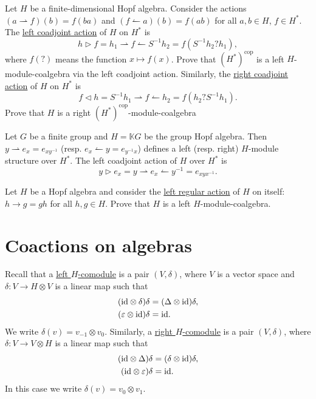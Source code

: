 \begin{exercise}
Let $H$ be a finite-dimensional Hopf algebra. Consider the actions
$(a\rightharpoonup f)(b)=f(ba)$ and $(f\leftharpoonup a)(b)=f(ab)$
for all $a,b\in H$, $f\in H^{*}$. The \underline{left coadjoint action}
of $H$ on $H^{*}$ is 
\[
h\triangleright f=h_{1}\rightharpoonup f\leftharpoonup S^{-1}h_{2}=f(S^{-1}h_{2}?h_1),
\]
where $f(?)$ means the function $x\mapsto f(x)$. Prove that
$(H^*)^\mathrm{cop}$ is a left $H$-module-coalgebra via the left coadjoint
action. Similarly, the \underline{right coadjoint action} of $H$ on $H^{*}$ is 
\[
f\triangleleft h=S^{-1}h_{1}\rightharpoonup f\leftharpoonup h_{2}=f(h_2?S^{-1}h_{1}).
\]
Prove that $H$ is a right $(H^*)^\mathrm{cop}$-module-coalgebra 
\end{exercise}

\begin{example}
Let $G$ be a finite group and $H=\mathbb{K}G$ be the group Hopf algebra. Then
$y\rightharpoonup e_{x}=e_{xy^{-1}}$ (resp. $e_{x}\leftharpoonup
y=e_{y^{-1}x}$) defines a left (resp. right) $H$-module structure over $H^{*}$.
The left coadjoint action of $H$ over $H^{*}$ is 
\[
y\triangleright e_{x}=y\rightharpoonup e_{x}\leftharpoonup y^{-1}=e_{xyx^{-1}}.
\]
\end{example}

\begin{exercise}
Let $H$ be a Hopf algebra and consider the \underline{left regular action} of $H$ on itself:
$h\rightarrow g=gh$ for all
$h,g\in H$. Prove that $H$ is a left $H$-module-coalgebra. 
\end{exercise}

\section{Coactions on algebras}

Recall that a \underline{left $H$-comodule} is a pair $(V,\delta)$,
where $V$ is a vector space and $\delta:V\to H\otimes V$ is a linear
map such that 
\begin{align*}
(\mathrm{id}\otimes\delta)\delta & =(\Delta\otimes\mathrm{id})\delta,\\
(\varepsilon\otimes\mathrm{id})\delta & =\mathrm{id}.
\end{align*}
We write $\delta(v)=v_{-1}\otimes v_{0}$. Similarly, a \underline{right
$H$-comodule} is a pair $(V,\delta)$, where $\delta:V\to V\otimes H$
is a linear map such that 
\begin{align*}
(\mathrm{id}\otimes\Delta)\delta & =(\delta\otimes\mathrm{id})\delta,\\
(\mathrm{id}\otimes\varepsilon)\delta & =\mathrm{id}.
\end{align*}
In this case we write $\delta(v)=v_{0}\otimes v_{1}$.

